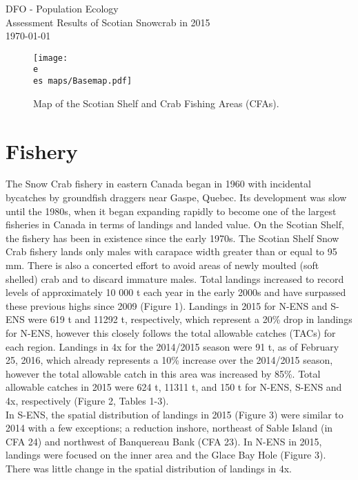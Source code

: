 \documentclass[paper=a4, fontsize=11pt]{article}
\newcommand{\e}{/home/michelle/ecomod_data/}
\newcommand{\es}{snowcrab/}
\begin{document}
  \begin{titlepage}
  \vspace*{\fill}
  \begin{center}
    {DFO - Population Ecology}\\[0.5cm]
    {Assessment Results of Scotian Snowcrab in 2015}\\[0.4cm]
    {\normalsize\today}
\begin{figure} [h]
\centering
  \texttt{[image: \\e \\es maps/Basemap.pdf]}
  \caption{Map of the Scotian Shelf and Crab Fishing Areas (CFAs).}
 \end{figure}
 \end{center}
\vspace*{\fill}
\end{titlepage}


\section{Fishery}
The Snow Crab fishery in eastern Canada began in 1960 with incidental bycatches by groundfish draggers near Gaspe, Quebec. Its development was slow until the 1980s, when it began expanding rapidly to become one of the largest fisheries in Canada in terms of landings and landed value. On the Scotian Shelf, the fishery has been in existence since the early 1970s. The Scotian Shelf Snow Crab fishery lands only males with carapace width greater than or equal to 95 mm. There is also a concerted effort to avoid areas of newly moulted (soft shelled) crab and to discard immature males. Total landings increased to record levels of approximately 10 000 t each year in the early 2000s and have surpassed these previous highs since 2009 (Figure 1). Landings in 2015 for N-ENS and S-ENS were 619 t and 11292 t, respectively, which represent a 20\% drop in landings for N-ENS, however this closely follows the total allowable catches (TACs) for each region. Landings in 4x for the 2014/2015 season were 91 t, as of February 25, 2016, which already represents a 10\% increase over the 2014/2015 season, however the total allowable catch in this area was increased by 85\%. Total allowable catches in 2015 were 624 t, 11311 t, and 150 t for N-ENS, S-ENS and 4x, respectively (Figure 2, Tables 1-3). \\

In S-ENS, the spatial distribution of landings in 2015 (Figure 3) were similar to 2014 with a few exceptions; a reduction inshore, northeast of Sable Island (in CFA 24) and northwest of Banquereau Bank (CFA 23). In N-ENS in 2015, landings were focused on the inner area and the Glace Bay Hole (Figure 3). There was little change in the spatial distribution of landings in 4x. \\
\end{document}
